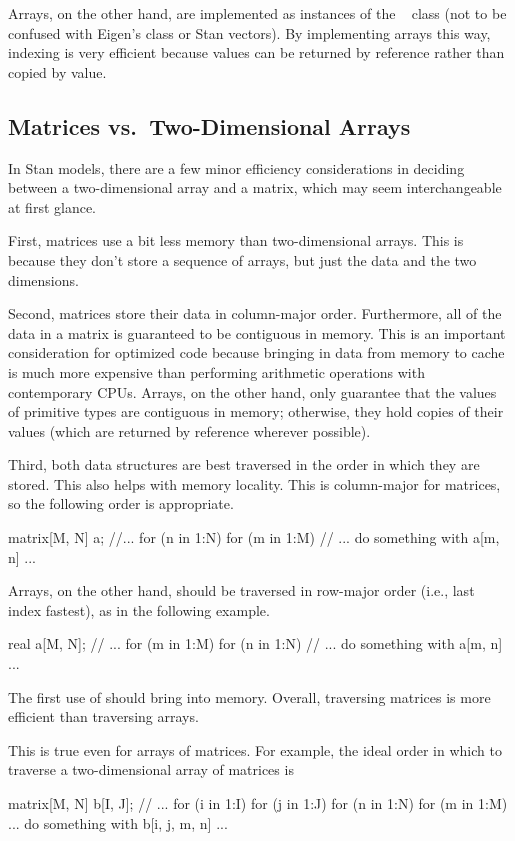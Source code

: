Arrays, on the other hand, are implemented as instances of the \Cpp \ 
 class (not to be confused with Eigen's
 class or Stan vectors).  By implementing arrays
this way, indexing is very efficient because values can be returned by
reference rather than copied by value.

\subsection{Matrices vs.\ Two-Dimensional Arrays}

In Stan models, there are a few minor efficiency considerations in
deciding between a two-dimensional array and a matrix, which may seem
interchangeable at first glance.  

First, matrices use a bit less memory than two-dimensional arrays.
This is because they don't store a sequence of arrays, but just the
data and the two dimensions.  

Second, matrices store their data in column-major order.  Furthermore,
all of the data in a matrix is guaranteed to be contiguous in memory.
This is an important consideration for optimized code because bringing
in data from memory to cache is much more expensive than performing
arithmetic operations with contemporary CPUs.  Arrays, on the other
hand, only guarantee that the values of primitive types are contiguous
in memory; otherwise, they hold copies of their values (which are
returned by reference wherever possible).

Third, both data structures are best traversed in the order in which
they are stored.  This also helps with memory locality.  This is
column-major for matrices, so the following order is appropriate.
%
\begin{stancode}
matrix[M, N] a;
//...
for (n in 1:N)
  for (m in 1:M)
    // ... do something with a[m, n] ...
\end{stancode}
%
Arrays, on the other hand, should be traversed in row-major order
(i.e., last index fastest), as in the following example.
%
\begin{stancode}
real a[M, N];
// ...
for (m in 1:M)
  for (n in 1:N)
    // ... do something with a[m, n] ...
\end{stancode}
%
The first use of  should bring  into memory.
Overall, traversing matrices is more efficient than traversing arrays.

This is true even for arrays of matrices.  For example, the ideal
order in which to traverse a two-dimensional array of matrices is
%
\begin{stancode}
matrix[M, N] b[I, J];
// ...
for (i in 1:I)
  for (j in 1:J)
    for (n in 1:N)
      for (m in 1:M)
        ... do something with b[i, j, m, n] ...
\end{stancode}

